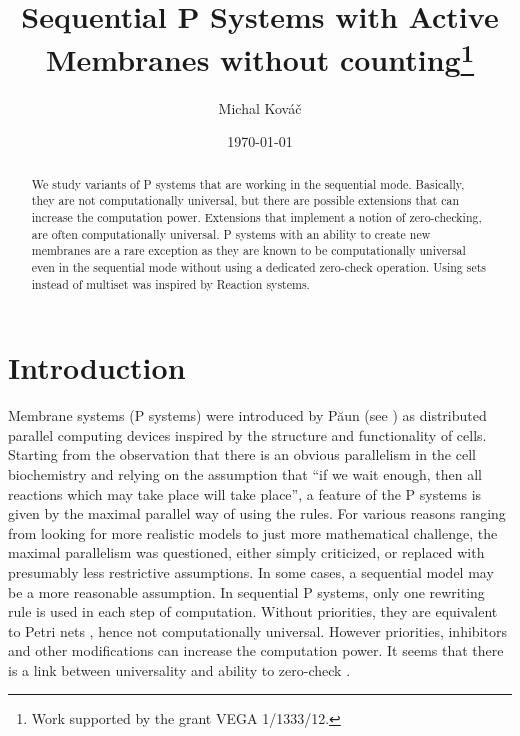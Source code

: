 \documentclass[llncs,submission,copyright,creativecommons]{../lib/lncs/llncs}
\def\red{\color{red}}
\begin{document}
\title{Sequential P Systems with Active Membranes without counting\thanks{Work supported by the grant VEGA 1/1333/12.}}
\author{Michal Kováč}
\date{\today}
\maketitle

\begin{abstract}
We study variants of P systems that are working in the sequential mode. Basically, they are not computationally universal, but there are possible extensions that can increase the computation power. Extensions that implement a notion of zero-checking, are often computationally universal.
P systems with an ability to create new membranes are a rare exception as they are known to be computationally universal even in the sequential mode without using a dedicated zero-check operation.
{\red Using sets instead of multiset was inspired by Reaction systems.}
\end{abstract}

\section{Introduction}
\label{sec:introduction}


Membrane systems (P systems) \cite{Paun10OxfordHandbookMembraneComputing} were introduced by P\u{a}un (see \cite{Paun2000108}) as distributed parallel computing devices inspired by the structure and functionality of cells. Starting from the observation that there is an obvious parallelism in the cell biochemistry and relying on the assumption that ``if we wait enough, then all reactions which may take place will take place'', a feature of the P systems is given by the maximal parallel way of using the rules. For various reasons ranging from looking for more realistic models to just more mathematical challenge, the maximal parallelism was questioned, either simply criticized, or replaced with presumably less restrictive assumptions.
In some cases, a sequential model may be a more reasonable assumption. In sequential P systems, only one rewriting rule is used in each step of computation. Without priorities, they are equivalent to Petri nets \cite{Ibarra05Active}, hence not computationally universal. However priorities, inhibitors and other modifications can increase the computation power. It seems that there is a link between universality and ability to zero-check \cite{Alhazov12Properties}.
\end{document}

